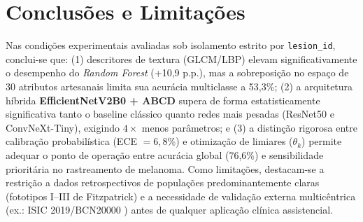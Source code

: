 \documentclass[12pt,a4paper]{article}
\begin{document}
\section{Conclusões e Limitações}
Nas condições experimentais avaliadas sob isolamento estrito por \texttt{lesion\_id}, conclui-se que: (1) descritores de textura (GLCM/LBP) elevam significativamente o desempenho do \textit{Random Forest} (+10,9 p.p.), mas a sobreposição no espaço de 30 atributos artesanais limita sua acurácia multiclasse a 53,3\%; (2) a arquitetura híbrida \textbf{EfficientNetV2B0 + ABCD} supera de forma estatisticamente significativa tanto o baseline clássico quanto redes mais pesadas (ResNet50 e ConvNeXt-Tiny), exigindo $4\times$ menos parâmetros; e (3) a distinção rigorosa entre calibração probabilística (ECE $= 6{,}8\%$) e otimização de limiares ($\theta_k$) permite adequar o ponto de operação entre acurácia global (76,6\%) e sensibilidade prioritária no rastreamento de melanoma. Como limitações, destacam-se a restrição a dados retrospectivos de populações predominantemente claras (fototipos I--III de Fitzpatrick) e a necessidade de validação externa multicêntrica (ex.: ISIC 2019/BCN20000 \cite{combalia2019}) antes de qualquer aplicação clínica assistencial.
\end{document}
